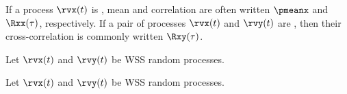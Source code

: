 If a process $\rvx(t)$ is , mean and correlation are often written
$\pmeanx$ and $\Rxx(\tau)$, respectively.
If a pair of processes $\rvx(t)$ and $\rvy(t)$ are ,
then their cross-correlation is commonly written $\Rxy(\tau)$.

\begin{definition}
\label{def:LSxx}
\label{def:LSyy}
\label{def:LSxy}
\label{def:LSyx}
Let $\rvx(t)$ and $\rvy(t)$ be WSS random processes.
\end{definition}

\begin{definition}
\label{def:Swxx}
\label{def:Swyy}
\label{def:Swxy}
\label{def:Swyx}
Let $\rvx(t)$ and $\rvy(t)$ be WSS random processes.
\end{definition}

